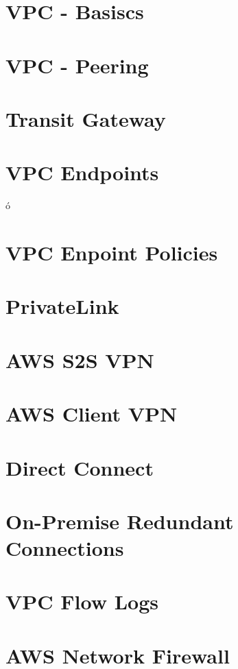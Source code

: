 \documentclass[11pt]{book}
\begin{document}
    \section{VPC - Basiscs}


    \section{VPC - Peering}


    \section{Transit Gateway}


    \section{VPC Endpoints}ó


    \section{VPC Enpoint Policies}


    \section{PrivateLink}


    \section{AWS S2S VPN}


    \section{AWS Client VPN}


    \section{Direct Connect}


    \section{On-Premise Redundant Connections}


    \section{VPC Flow Logs}


    \section{AWS Network Firewall}
\end{document}
